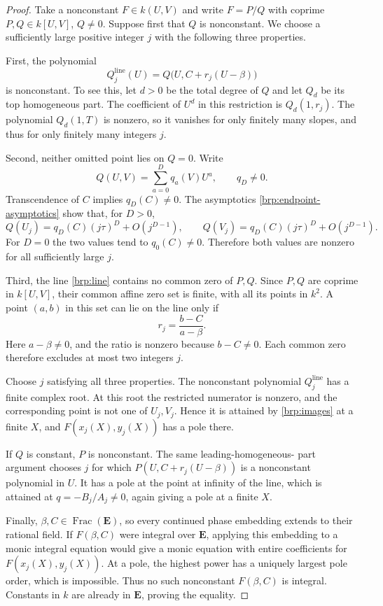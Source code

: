\documentclass[11pt]{article}
\theoremstyle{definition}
\theoremstyle{remark}
\newcommand{\E}{\mathbf E}
\begin{document}
\begin{proof}
Take a nonconstant $F\in k(U,V)$ and write $F=P/Q$ with coprime
$P,Q\in k[U,V]$, $Q\ne0$.  Suppose first that $Q$ is nonconstant.
We choose a sufficiently large positive integer $j$ with the following
three properties.

First, the polynomial
\[
 Q_j^{\mathrm{line}}(U)=Q\bigl(U,C+r_j(U-\beta)\bigr)
\]
is nonconstant.  To see this, let $d>0$ be the total degree of $Q$
and let $Q_d$ be its top homogeneous part.  The coefficient of $U^d$
in this restriction is $Q_d(1,r_j)$.  The polynomial $Q_d(1,T)$
is nonzero, so it vanishes for only finitely many slopes, and thus for
only finitely many integers $j$.

Second, neither omitted point lies on $Q=0$.  Write
\[
 Q(U,V)=\sum_{a=0}^D q_a(V)U^a,\qquad q_D\ne0.
\]
Transcendence of $C$ implies $q_D(C)\ne0$.  The asymptotics
\eqref{brp:endpoint-asymptotics} show that, for $D>0$,
\[
 Q(U_j)=q_D(C)(j\tau)^D+O(j^{D-1}),\qquad
 Q(V_j)=q_D(C)(j\tau)^D+O(j^{D-1}).
\]
For $D=0$ the two values tend to $q_0(C)\ne0$.  Therefore both
values are nonzero for all sufficiently large $j$.

Third, the line \eqref{brp:line} contains no common zero of $P,Q$.
Since $P,Q$ are coprime in $k[U,V]$, their common affine zero set is
finite, with all its points in $k^2$.  A point $(a,b)$ in this set
can lie on the line only if
\[
 r_j=\frac{b-C}{a-\beta}.
\]
Here $a-\beta\ne0$, and the ratio is nonzero because $b-C\ne0$.
Each common zero therefore excludes at most two integers $j$.

Choose $j$ satisfying all three properties.  The nonconstant polynomial
$Q_j^{\mathrm{line}}$ has a finite complex root.  At this root the
restricted numerator is nonzero, and the corresponding point is not
one of $U_j,V_j$.  Hence it is attained by \eqref{brp:images} at a
finite $X$, and $F(x_j(X),y_j(X))$ has a pole there.

If $Q$ is constant, $P$ is nonconstant.  The same leading-homogeneous-
part argument chooses $j$ for which
$P(U,C+r_j(U-\beta))$ is a nonconstant polynomial in $U$.  It has
a pole at the point at infinity of the line, which is attained at
$q=-B_j/A_j\ne0$, again giving a pole at a finite $X$.

Finally, $\beta,C\in\operatorname{Frac}(\E)$, so every continued
phase embedding extends to their rational field.  If $F(\beta,C)$
were integral over $\E$, applying this embedding to a monic
integral equation would give a monic equation with entire coefficients
for $F(x_j(X),y_j(X))$.  At a pole, the highest power has a uniquely
largest pole order, which is impossible.  Thus no such nonconstant
$F(\beta,C)$ is integral.  Constants in $k$ are already in
$\E$, proving the equality.
\end{proof}
\end{document}

